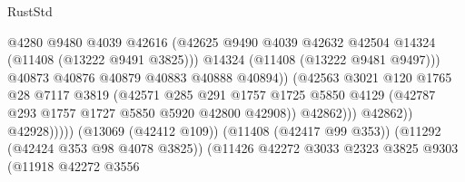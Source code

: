 \begin{lexlean}{RustStd}
\begin{coremodule}
                                                  @4280
                                                  @9480
                                                  @4039
                                                  @42616
                                                  (@42625
                                                    @9490
                                                    @4039
                                                    @42632
                                                    @42504
                                                    @14324
                                                    (@11408 (@13222 @9491 @3825)))
                                                  @14324
                                                  (@11408 (@13222 @9481 @9497)))
                                                @40873
                                                @40876
                                                @40879
                                                @40883
                                                @40888
                                                @40894))
                                            (@42563
                                              @3021
                                              @120
                                              @1765
                                              @28
                                              @7117
                                              @3819
                                              (@42571
                                                @285
                                                @291
                                                @1757
                                                @1725
                                                @5850
                                                @4129
                                                (@42787 @293 @1757 @1727 @5850 @5920 @42800 @42908))
                                              @42862)))
                                        @42862))
                                    @42928)))))
                          (@13069 (@42412 @109))
                          (@11408 (@42417 @99 @353))
                          (@11292 (@42424 @353 @98 @4078 @3825))
                          (@11426
                            @42272
                            @3033
                            @2323
                            @3825
                            @9303
                            (@11918
                              @42272
                              @3556

\end{coremodule}
\end{lexlean}
